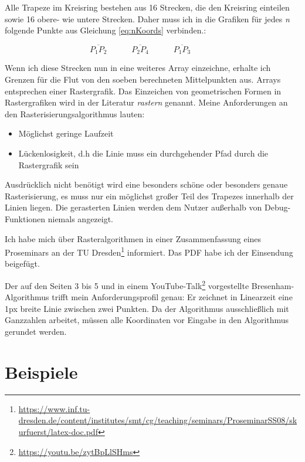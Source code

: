	Alle Trapeze im Kreisring bestehen aus 16 Strecken, die den Kreisring einteilen sowie 16 obere- wie untere Strecken. Daher muss ich in die Grafiken für jedes \textit{n} folgende Punkte aus Gleichung \eqref{eq:nKoords} verbinden.:
	
	\begin{equation}
		\overline{P_1P_2} \hspace{3em}
		\overline{P_2P_4} \hspace{3em}
		\overline{P_1P_3} \hspace{3em}
	\end{equation}

	Wenn ich diese Strecken nun in eine weiteres Array einzeichne, erhalte ich Grenzen für die Flut von den soeben berechneten Mittelpunkten aus. Arrays entsprechen einer Rastergrafik. Das Einzeichen von geometrischen Formen in Rastergrafiken wird in der Literatur \textit{rastern} genannt. Meine Anforderungen an den Rasterisierungsalgorithmus lauten:
	\begin{itemize}
		\item Möglichst geringe Laufzeit
		\item Lückenlosigkeit, d.h die Linie muss ein durchgehender Pfad durch die Rastergrafik sein
	\end{itemize}
	Ausdrücklich nicht benötigt wird eine besonders schöne oder besonders genaue Rasterisierung, es muss nur ein möglichst großer Teil des Trapezes innerhalb der Linien liegen. Die gerasterten Linien werden dem Nutzer außerhalb von Debug-Funktionen niemals angezeigt.

	Ich habe mich über Rasteralgorithmen in einer Zusammenfassung eines Proseminars an der TU Dresden\footnote{\url{https://www.inf.tu-dresden.de/content/institutes/smt/cg/teaching/seminars/ProseminarSS08/skurfuerst/latex-doc.pdf}} informiert. Das PDF habe ich der Einsendung beigefügt.
	
	Der auf den Seiten 3 bis 5 und in einem YouTube-Talk\footnote{\url{https://youtu.be/zytBpLlSHms}} vorgestellte Bresenham-Algorithmus trifft mein Anforderungsprofil genau: Er zeichnet in Linearzeit eine 1px breite Linie zwischen zwei Punkten. Da der Algorithmus ausschließlich mit Ganzzahlen arbeitet, müssen alle Koordinaten vor Eingabe in den Algorithmus gerundet werden.
\section{Beispiele}
